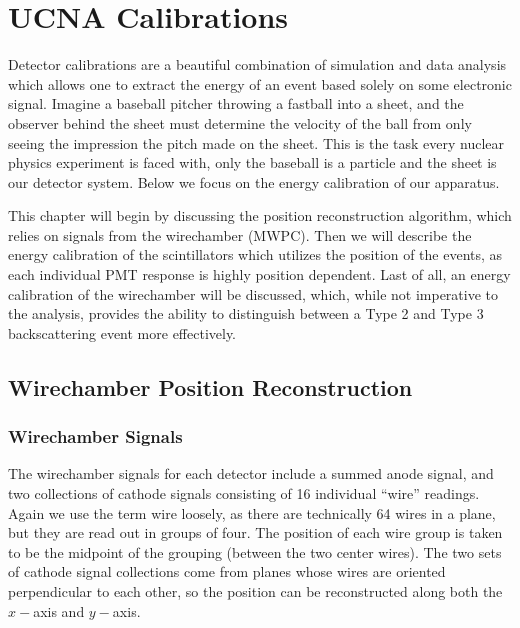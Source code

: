 \chapter{UCNA Calibrations}
\label{ch:UCNA_Calibrations}

Detector calibrations are a beautiful combination
of simulation and data analysis which allows one to extract the energy of
an event based solely on some electronic signal. Imagine a baseball pitcher
throwing a fastball into a sheet, and the observer behind the sheet must
determine the velocity of the ball from only seeing the impression the pitch
made on the sheet. This is the task every nuclear physics experiment is faced
with, only the baseball is a particle and the sheet is our detector system.
Below we focus on the energy calibration of our apparatus.

This chapter will begin by discussing the position reconstruction algorithm,
which relies on signals from the wirechamber (MWPC). Then we will describe
the energy calibration of the scintillators which utilizes the
position of the events, as each individual PMT response is highly position
dependent. Last of all, an energy calibration of the wirechamber will be
discussed, which, while not imperative to the analysis, provides the ability to
distinguish between a Type 2 and Type 3 backscattering event more
effectively.




\section{Wirechamber Position Reconstruction}

\subsection{Wirechamber Signals}

The wirechamber signals for each detector include a summed anode signal, and two collections of
cathode signals consisting of 16 individual ``wire'' readings. Again we use the term
wire loosely, as there are technically 64 wires in a plane, but they are read out in groups
of four. The position of each wire group is taken to be the midpoint of the grouping (between
the two center wires). The two sets of cathode signal collections come from planes
whose wires are oriented perpendicular to each other,
so the position can be reconstructed along both the $x-$axis and $y-$axis.


